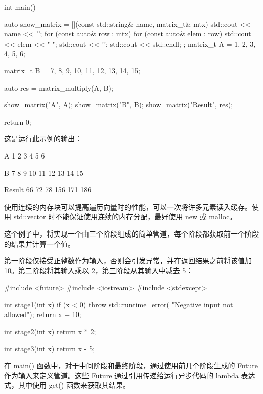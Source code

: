 \begin{cpp}
int main() {
    auto show_matrix = [](const std::string& name,
                          matrix_t& mtx) {
        std::cout << name << '\n';
        for (const auto& row : mtx) {
            for (const auto& elem : row) {
                std::cout << elem << " ";
            }
            std::cout << '\n';
        }
        std::cout << std::endl;
    };
    matrix_t A = {{1, 2, 3},
                  {4, 5, 6}};

    matrix_t B = {{7, 8, 9},
                  {10, 11, 12},
                  {13, 14, 15}};

    auto res = matrix_multiply(A, B);

    show_matrix("A", A);
    show_matrix("B", B);
    show_matrix("Result", res);

    return 0;
}
\end{cpp}

这是运行此示例的输出：

\begin{cpp}
A
1 2 3
4 5 6

B
7 8 9
10 11 12
13 14 15

Result
66 72 78
156 171 186
\end{cpp}

使用连续的内存块可以提高遍历向量时的性能，可以一次将许多元素读入缓存。使用 std::vector 时不能保证使用连续的内存分配，最好使用 new 或 malloc。


这个例子中，将实现一个由三个阶段组成的简单管道，每个阶段都获取前一个阶段的结果并计算一个值。


第一阶段仅接受正整数作为输入，否则会引发异常，并在返回结果之前将该值加 10。第二阶段将其输入乘以 2，第三阶段从其输入中减去 5：

\begin{cpp}
#include <future>
#include <iostream>
#include <stdexcept>

int stage1(int x) {
    if (x < 0) throw std::runtime_error(
    "Negative input not allowed");
    return x + 10;
}

int stage2(int x) {
    return x * 2;
}

int stage3(int x) {
    return x - 5;
}
\end{cpp}

在 main() 函数中，对于中间阶段和最终阶段，通过使用前几个阶段生成的 Future 作为输入来定义管道。这些 Future 通过引用传递给运行异步代码的 lambda 表达式，其中使用 get() 函数来获取其结果。

